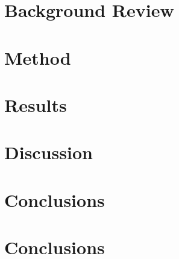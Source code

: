 \documentclass[conference,letterpaper]{IEEEtran}
\begin{document}
\section{Background Review} \label{sec:background}


\section{Method} \label{sec:method}


\section{Results} \label{sec:results}


\section{Discussion} \label{sec:discussion}


\section{Conclusions}
\lipsum[1]

\section{Conclusions} \label{sec:conclusions}

\FloatBarrier

%

%
\end{document}
